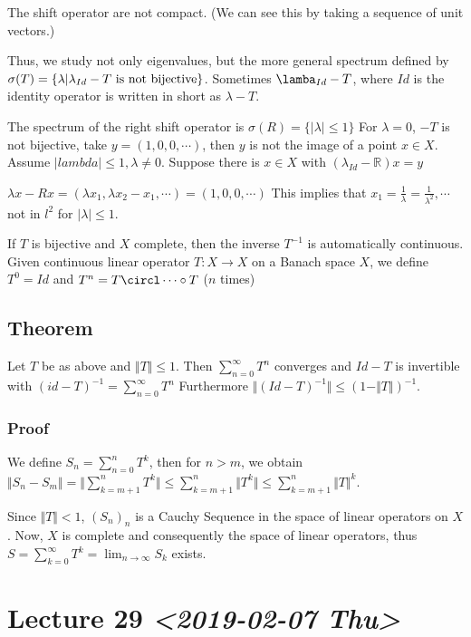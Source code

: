 \documentclass[11pt]{article}
\def\R{\mathbb{R}}
\begin{document}
The shift operator are not compact. (We can see this by taking a sequence of
unit vectors.)

Thus, we study not only eigenvalues, but the more general spectrum defined by
\(\sigma (T) = \{ \lambda \vert \lambda_{Id} - T \textup{ is not
   bijective}\}\). Sometimes \(\lamba_{Id} - T\), where \(Id\) is the identity
operator is written in short as \(\lambda - T\).

The spectrum of the right shift operator is \(\sigma(R) = \{\vert \lambda
   \vert \le 1\}\) For \(\lambda = 0\), \(-T\) is not bijective, take \(y = (1, 0, 0,
   \cdots)\), then \(y\) is not the image of a point \(x \in X\). Assume \(\vert
   lambda \vert \le 1, \lambda \neq 0\). Suppose there is \(x \in X\) with
\((\lambda_{Id} - \R)x = y\)

\(\lambda x - Rx = (\lambda x_1, \lambda x_2 - x_1, \cdots) = (1, 0, 0,
   \cdots)\) This implies that \(x_1 = \frac1\lambda = \frac{1}{\lambda^2},
   \cdots\) not in \(l^2\) for \(\vert \lambda \vert \le 1\).

If \(T\) is bijective and \(X\) complete, then the inverse \(T^{-1}\) is
automatically continuous. Given continuous linear operator \(T \colon X
   \rightarrow X\) on a Banach space \(X\), we define \(T^{0} = Id\) and \(T^n = T
   \circl \cdots \circ T\) (\(n\) times)
\subsection{Theorem}
\label{sec:org82f4f9a}
Let \(T\) be as above and \(\Vert T \Vert \le 1\). Then \(\sum_{n=0}^{\infty} T^n\)
converges and \(Id - T\) is invertible with \((id - T)^{-1} =
   \sum_{n=0}^{\infty} T^n\) Furthermore \(\Vert (Id - T)^{-1}\Vert \le (1 - \Vert
   T \Vert)^{-1}\).
\subsubsection{Proof}
\label{sec:orgaae7ce6}
We define \(S_n = \sum_{n = 0}^{n} T^k\), then for \(n > m\), we obtain \(\Vert
    S_n - S_m \Vert = \Vert \sum_{k = m+1}^{n} T^k\Vert \le \sum_{k = m+1}^{n}
    \Vert T^k\Vert \le \sum_{k=m+1}^{n} \Vert T \Vert^k\).

Since \(\Vert T \Vert < 1\), \((S_n)_n\) is a Cauchy Sequence in the space of
linear operators on \(X\). Now, \(X\) is complete and consequently the space of
linear operators, thus \(S = \sum_{k=0}^{\infty} T^k =\lim_{n \rightarrow
    \infty} S_k\) exists.
\section{Lecture 29 \textit{<2019-02-07 Thu>}}
\label{sec:org2f0dd7b}
\end{document}
